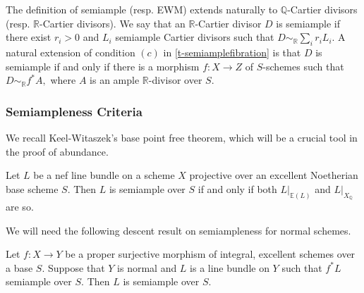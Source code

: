 \documentclass[a4paper,12pt]{book}
\begin{document}
	The definition of semiample (resp. EWM) extends naturally to $\mathbb{Q}$-Cartier divisors (resp. $\mathbb{R}$-Cartier divisors).
	We say that an $\mathbb{R}$-Cartier divisor $D$ is semiample if there exist $r_i>0$ and $L_i$ semiample Cartier divisors such that $D \sim_{\mathbb{R}}\sum_i r_{i}L_{i}$. A natural extension of condition $(c)$ in \autoref{t-semiamplefibration} is that $D$ is semiample if and only if there is a morphism $f \colon X \to Z$ of $S$-schemes such that $D\sim_{\mathbb{R}} f^*A,$ where $A$ is an ample $\mathbb{R}$-divisor over $S$.
	
	\subsubsection{Semiampleness Criteria}
	
	We recall Keel-Witaszek's base point free theorem, which will be a crucial tool in the proof of abundance.
	
	\begin{theorem}
		Let $L$ be a nef line bundle on a scheme $X$
		projective over an excellent Noetherian base scheme $S$. Then $L$ is semiample over $S$ if and only if both $L|_{\mathbb{E}(L)}$ and $L|_{X_{\mathbb{Q}}}$
		are so.
	\end{theorem}
	
	We will need the following descent result on semiampleness for normal schemes.
	
	\begin{lemma}\label{pullback}
		
		Let $f \colon X \to Y$ be a proper surjective morphism of integral, excellent schemes over a base $S$. Suppose that $Y$ is normal and $L$  is a line bundle on $Y$ such that $f^{*}L$ semiample over $S$.
		Then $L$ is semiample over $S$.
		
	\end{lemma}
	
\end{document}
